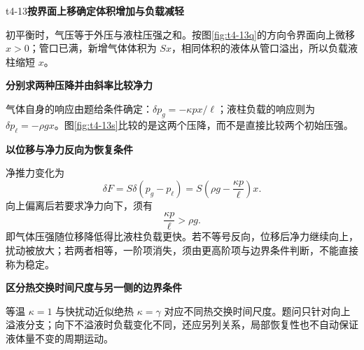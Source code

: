\begin{drillsolution}{t4-13}\textbf{按界面上移确定体积增加与负载减轻}\par\nobreak
初平衡时，气压等于外压与液柱压强之和。按图\ref{fig:t4-13q}的方向令界面向上微移 $x>0$；管口已满，新增气体体积为 $Sx$，相同体积的液体从管口溢出，所以负载液柱缩短 $x$。


\par\medskip{}\noindent\textbf{分别求两种压降并由斜率比较净力}\par\nobreak
气体自身的响应由题给条件确定：$\delta p_g=-\kappa px/\ell$；液柱负载的响应则为 $\delta p_\ell=-\rho gx$。图\ref{fig:t4-13s}比较的是这两个压降，而不是直接比较两个初始压强。



\par\medskip{}\noindent\textbf{以位移与净力反向为恢复条件}\par\nobreak
净推力变化为
\[\delta F=S\delta(p_g-p_\ell)=S\left(\rho g-\frac{\kappa p}{\ell}\right)x.\]
向上偏离后若要求净力向下，须有
\[\boxed{\frac{\kappa p}{\ell}>\rho g}.\]
即气体压强随位移降低得比液柱负载更快。若不等号反向，位移后净力继续向上，扰动被放大；若两者相等，一阶项消失，须由更高阶项与边界条件判断，不能直接称为稳定。


\par\medskip{}\noindent\textbf{区分热交换时间尺度与另一侧的边界条件}\par\nobreak
等温 $\kappa=1$ 与快扰动近似绝热 $\kappa=\gamma$ 对应不同热交换时间尺度。题问只针对向上溢液分支；向下不溢液时负载变化不同，还应另列关系，局部恢复性也不自动保证液体量不变的周期运动。
\end{drillsolution}
